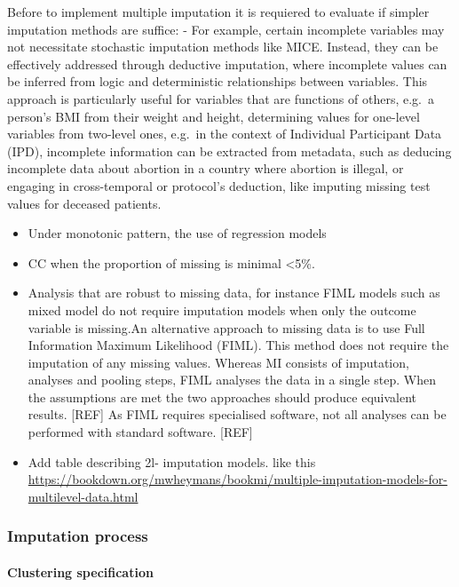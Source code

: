 \documentclass[
]{jss}
\begin{document}
Before to implement multiple imputation it is requiered to evaluate if
simpler imputation methods are suffice: - For example, certain
incomplete variables may not necessitate stochastic imputation methods
like MICE. Instead, they can be effectively addressed through deductive
imputation, where incomplete values can be inferred from logic and
deterministic relationships between variables. This approach is
particularly useful for variables that are functions of others, e.g.~a
person's BMI from their weight and height, determining values for
one-level variables from two-level ones, e.g.~in the context of
Individual Participant Data (IPD), incomplete information can be
extracted from metadata, such as deducing incomplete data about abortion
in a country where abortion is illegal, or engaging in cross-temporal or
protocol's deduction, like imputing missing test values for deceased
patients.

\begin{itemize}
\item
  Under monotonic pattern, the use of regression models
\item
  CC when the proportion of missing is minimal \textless5\%.
\item
  Analysis that are robust to missing data, for instance FIML models
  such as mixed model do not require imputation models when only the
  outcome variable is missing.An alternative approach to missing data is
  to use Full Information Maximum Likelihood (FIML). This method does
  not require the imputation of any missing values. Whereas MI consists
  of imputation, analyses and pooling steps, FIML analyses the data in a
  single step. When the assumptions are met the two approaches should
  produce equivalent results. {[}REF{]} As FIML requires specialised
  software, not all analyses can be performed with standard software.
  {[}REF{]}
\item
  Add table describing 2l- imputation models. like this
  \url{https://bookdown.org/mwheymans/bookmi/multiple-imputation-models-for-multilevel-data.html}
\end{itemize}

\hypertarget{imputation-process}{%
\subsubsection{Imputation process}\label{imputation-process}}

\hypertarget{clustering-specification}{%
\paragraph{Clustering specification}\label{clustering-specification}}
\end{document}
